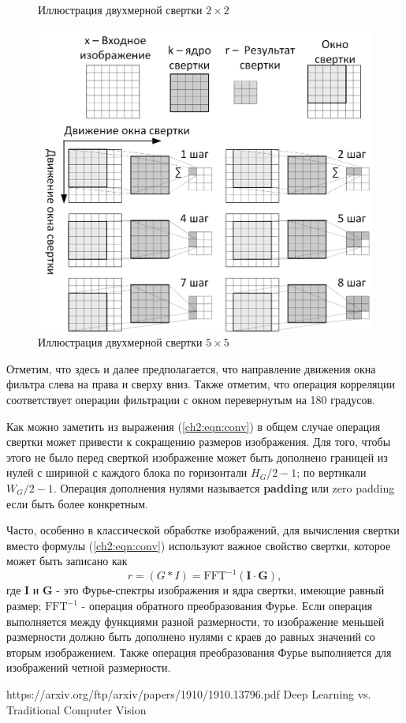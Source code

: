 \documentclass[12pt]{article}
\begin{document}
\begin{sloppypar}
\begin{figure}[!h]
\begin{center}
		\caption{Иллюстрация двухмерной свертки $2 \times 2$}		
		\label{ch2:fig:2d_conv_stride_1_v2}

		\includegraphics[width=0.76\linewidth]{./figuresch1/2d_conv_stride_1_v3.png}
		\caption{Иллюстрация двухмерной свертки $5 \times 5$}		
		\label{ch2:fig:2d_conv_stride_1}
	\end{center}
\end{figure}
Отметим, что здесь и далее предполагается, что направление движения окна фильтра слева на права и сверху вниз. Также отметим, что операция корреляции соответствует операции фильтрации с окном перевернутым на 180 градусов.

Как можно заметить из выражения (\ref{ch2:eqn:conv}) в общем случае операция свертки может привести к сокращению размеров изображения. Для того, чтобы этого не было перед сверткой изображение  может быть дополнено границей из нулей с шириной с каждого блока по горизонтали $H_G/2-1$; по вертикали $W_G/2-1$. Операция дополнения нулями называется \textbf{padding} или zero padding если быть более конкретным.

Часто, особенно в классической обработке изображений, для вычисления свертки вместо формулы (\ref{ch2:eqn:conv}) используют важное свойство свертки, которое может быть записано как
\begin{equation}
    r = (G\ast I) = {\mathrm{FFT}}^{-1}(\mathbf{I}\cdot\mathbf{G}),
    \label{ch2:eqn:conv} 
\end{equation}
где $\mathbf{I}$ и $\mathbf{G}$ - это Фурье-спектры изображения и ядра свертки, имеющие равный размер; ${\mathrm{FFT}}^{-1}$ - операция обратного преобразования Фурье.  Если операция выполняется между функциями разной размерности, то изображение меньшей размерности должно быть дополнено нулями с краев до равных значений со вторым изображением.
Также операция преобразования Фурье выполняется для изображений четной размерности.


https://arxiv.org/ftp/arxiv/papers/1910/1910.13796.pdf
Deep Learning vs. Traditional Computer Vision


\newpage


\end{sloppypar}
\end{document}
